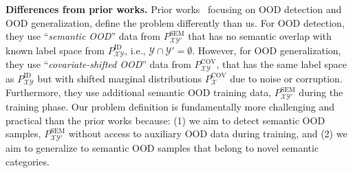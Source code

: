 \textbf{Differences from prior works.}
Prior works~\cite{zhang2024best, wang2024bridging, bai2023feed} focusing on OOD detection and OOD generalization, define the problem differently than us. For OOD detection, they use ``\emph{semantic OOD}'' data from \( P_{\mathcal{X}\mathcal{Y}'}^{\text{SEM}} \) that has no semantic overlap with known label space from \( P_{\mathcal{X}\mathcal{Y}}^{\text{ID}} \), i.e., \( \mathcal{Y} \cap \mathcal{Y}' = \emptyset \). However, for OOD generalization, they use ``\emph{covariate-shifted OOD}'' data from \( P_{\mathcal{X}\mathcal{Y}}^{\text{COV}} \), that has the same label space as \( P_{\mathcal{X}\mathcal{Y}}^{\text{ID}} \) but with shifted marginal distributions \( P_\mathcal{X}^{\text{COV}} \) due to noise or corruption. Furthermore, they use additional semantic OOD training data, \( P_{\mathcal{X}\mathcal{Y}'}^{\text{SEM}} \) during the training phase.
Our problem definition is fundamentally more challenging and practical than the prior works because: (1) we aim to detect semantic OOD samples, \( P_{\mathcal{X}\mathcal{Y}'}^{\text{SEM}} \) without access to auxiliary OOD data during training, and (2) we aim to generalize to semantic OOD samples that belong to novel semantic categories.





